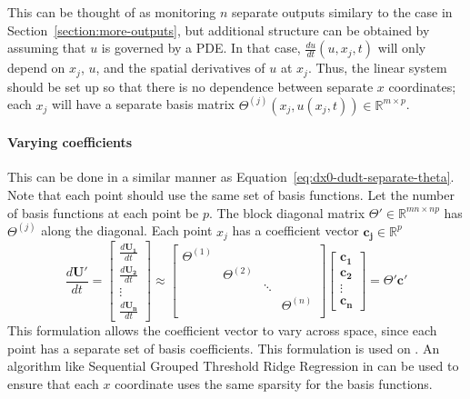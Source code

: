 \documentclass{article}
\let\vec\mathbf
\def\real{\mathbb{R}}
\begin{document}
This can be thought of as monitoring $n$ separate outputs similary to the case
in Section~\ref{section:more-outputs}, but additional structure can be obtained by
assuming that $u$ is governed by a PDE. In that case, $\frac{du}{dt}(u,x_j,t)$
will only depend on $x_j$, $u$, and the spatial derivatives of $u$ at $x_j$.
Thus, the linear system should be set up so that there is no dependence between
separate $x$ coordinates; each $x_j$ will have a separate basis matrix
$\Theta^{(j)}(x_j, u(x_j,t)) \in \real^{m \times p}$.

\paragraph{Varying coefficients}
This can be done in a similar manner as
Equation~\ref{eq:dx0-dudt-separate-theta}. Note that each point should use the
same set of basis functions. Let the number of basis functions at each point be
$p$. The block diagonal matrix $\Theta' \in \real^{mn \times np}$ has
$\Theta^{(j)}$ along the diagonal. Each point $x_j$ has a coefficient vector
$\vec{c_j} \in \real^p$
\begin{equation}\label{eq:coord-varying}
\frac{d\vec{U'}}{dt} = 
\begin{bmatrix}
\frac{d\vec{U_1}}{dt} \\ \frac{d\vec{U_2}}{dt} \\ \vdots \\ \frac{d\vec{U_n}}{dt}
\end{bmatrix}
\approx
\begin{bmatrix}
\Theta^{(1)} \\
& \Theta^{(2)} \\
& & \ddots \\
& & & \Theta^{(n)} \\
\end{bmatrix}
\begin{bmatrix}
\vec{c_1} \\ \vec{c_2} \\ \vdots \\ \vec{c_{n}}
\end{bmatrix}
= \Theta' \vec{c}'
\end{equation}
This formulation allows the coefficient vector to vary across space, since each
point has a separate set of basis coefficients. This formulation is used on
\cite{shea2020sindy-bvp}. An algorithm like Sequential Grouped Threshold Ridge
Regression in \cite{shea2020sindy-bvp} can be used to ensure that each $x$
coordinate uses the same sparsity for the basis functions.
\end{document}
